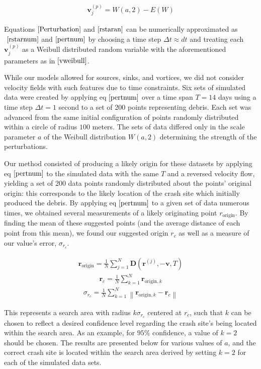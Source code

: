 \documentclass[pre,12pt]{revtex4-1}
\begin{document}
\begin{align}\label{vweibull} \mathbf{v}^{(p)}_j = W(a,2) - E(W) \end{align}

Equations$~\eqref{Perturbation}$ and$~\eqref{rstaran}$ can be numerically approximated as$~\eqref{rstarnum}$ and$~\eqref{pertnum}$ by choosing a time step $\Delta t \approx dt$ and treating each $\mathbf{v}_j^{(p)}$ as a Weibull distributed random variable with the aforementioned parameters as in$~\eqref{vweibull}$.

While our models allowed for sources, sinks, and vortices, we did not consider velocity fields with such features due to time constraints. Six sets of simulated data were created by applying eq$~\eqref{pertnum}$ over a time span $T = 14$ days using a time step $\Delta t=1$ second to a set of 200 points representing debris. Each set was advanced from the same initial configuration of points randomly distributed within a circle of radius $100$ meters. The sets of data differed only in the scale parameter $a$ of the Weibull distribution $W(a,2)$ determining the strength of the perturbations.

Our method consisted of producing a likely origin for these datasets by applying eq$~\eqref{pertnum}$ to the simulated data with the same $T$ and a reversed velocity flow, yielding a set of 200 data points randomly distributed about the points' original origin: this corresponds to the likely location of the crash site which initially produced the debris. By applying eq$~\eqref{pertnum}$ to a given set of data numerous times, we obtained several measurements of a likely originating point $r_\text{origin}$. By finding the mean of these suggested points (and the average distance of each point from this mean), we found our suggested origin $r_c$ as well as a measure of our value's error, $\sigma_{r_c}$.

\begin{align} \mathbf{r}_\text{origin} = \frac{1}{N} \sum_{j=1}^N \mathbf{D}(\mathbf{r}^{(j)},-\mathbf{v},T) \end{align}
\begin{align} \mathbf{r}_c = \frac{1}{N} \sum_{k=1}^N \mathbf{r}_{\text{origin},k} \end{align}
\begin{align} \sigma_{r_c} = \frac{1}{N} \sum_{k=1}^N \left\lVert \mathbf{r}_{\text{origin},k} - \mathbf{r}_c \right\rVert \end{align}

This represents a search area with radius $k \sigma_{r_c}$ centered at $r_c$, such that $k$ can be chosen to reflect a desired confidence level regarding the crash site's being located within the search area. As an example, for $95\%$ confidence, a value of $k = 2$ should be chosen. The results are presented below for various values of $a$, and the correct crash site is located within the search area derived by setting $k = 2$ for each of the simulated data sets.
\end{document}
